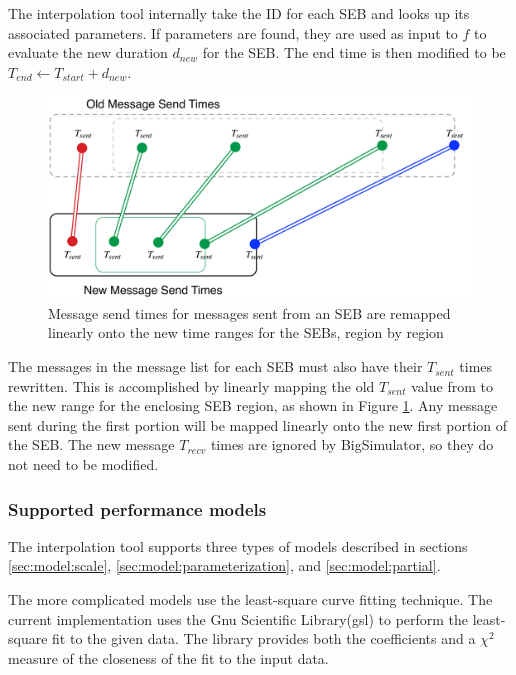 The interpolation tool internally take the ID for each SEB and looks up its associated parameters. If parameters are found, they are used as input to $f$ to evaluate the new duration $d_{new}$ for the SEB. The end time is then modified to be $T_{end}\leftarrow  T_{start}+d_{new}$.

\begin{figure}
\centering
\includegraphics[width=6in]{figures/event_diagram2}
\caption{Message send times for messages sent from an SEB are remapped linearly onto the new time ranges for the SEBs, region by region\label{event_diagram2}}
\end{figure}

The messages in the message list for each SEB must also have their $T_{sent}$ times rewritten. This is accomplished by linearly mapping the old $T_{sent}$ value from to the new range for the enclosing SEB region, as shown in Figure \ref{event_diagram2}. Any message sent during the first portion will be mapped linearly onto the new first portion of the SEB. The new message $T_{recv}$ times are ignored by BigSimulator, so they do not need to be modified.


\subsubsection{Supported performance models}
The interpolation tool supports three types of models described in sections \ref{sec:model:scale}, \ref{sec:model:parameterization}, and \ref{sec:model:partial}. 

The more complicated models use the least-square curve fitting technique. The current implementation uses the Gnu Scientific Library(gsl) to perform the least-square fit to the given data. The library provides both the coefficients and a $\chi^2$ measure of the closeness of the fit to the input data. 


